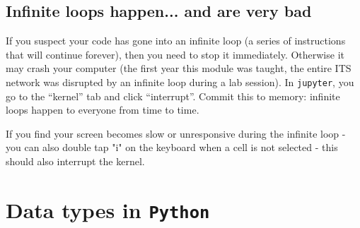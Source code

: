 \subsection{Infinite loops happen... and are very bad}
\label{sec:infiniloop}

If you suspect your code has gone into an infinite loop (a series of instructions that will continue forever), then you need to stop it immediately. Otherwise it may crash your computer (the first year this module was taught, the entire ITS network was disrupted by an infinite loop during a lab session). In \texttt{jupyter}, you go to the ``kernel'' tab and click ``interrupt''. Commit this to memory: infinite loops happen to everyone from time to time.

If you find your screen becomes slow or unresponsive during the infinite loop - you can also double tap "i" on the keyboard when a cell is not selected - this should also interrupt the kernel.


\section{Data types in \texttt{Python}}
\label{dtypes}

